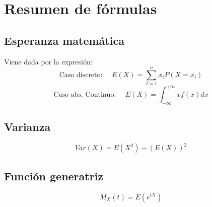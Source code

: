 \chapter{Resumen de fórmulas}
\section{Esperanza matemática}

Viene dada por la expresión:
$$\text{Caso discreto:      } \quad E(X)=\sum_{I=1}^n x_iP(X=x_i)$$ 
$$\text{Caso abs. Continuo: } \quad E(X)=\int_{-\infty}^{+\infty}xf(x)dx$$

\section{Varianza}

$$Var(X)=E(X^2)-(E(X))^2$$

\section{Función generatriz}

$$M_X(t)=E(e^{tX})$$


